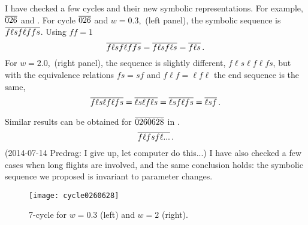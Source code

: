 I have checked a few cycles and their new symbolic representations. For
example, ${\overline{026}}$ and . For cycle ${\overline{026}}$ and
$w=0.3$, \,(left panel),
the symbolic sequence is ${\overline{f\ell sf\ell f fs}}$.
Using $f f = 1$
\[
{\overline{f\ell sf\ell f fs}}
    = {\overline{f\ell sf\ell s}}
    = {\overline{f\ell s}}
\,.
\]
For $w=2.0$, \,(right panel), the
sequence is slightly different, $f\ell s\ell f \ell fs$, but with the
equivalence relations
$f s = s f$ and $f \ell f = \ell f \ell$ the end sequence is the
same,
\[
{\overline{f\ell s\ell f \ell fs}}
    = {\overline{\ell s\ell f \ell s}}
    = {\overline{\ell s f \ell f s}}
    = {\overline{\ell s f}}
\,.
\]

Similar results can be obtained for ${\overline{0260628}}$ in
.
\[
{\overline{f \ell f s f \ell ...}}
\,.
\]
(2014-07-14 Predrag: I give up, let computer do this...)
I have also
checked a few cases when long flights are involved, and the same
conclusion holds: the symbolic sequence we proposed is invariant to
parameter changes.

\begin{figure}
\texttt{[image: cycle0260628]}
\caption{\label{fig:cycle0260628A}
7-cycle  for $w=0.3$ (left) and $w=2$ (right).
}
\end{figure}

